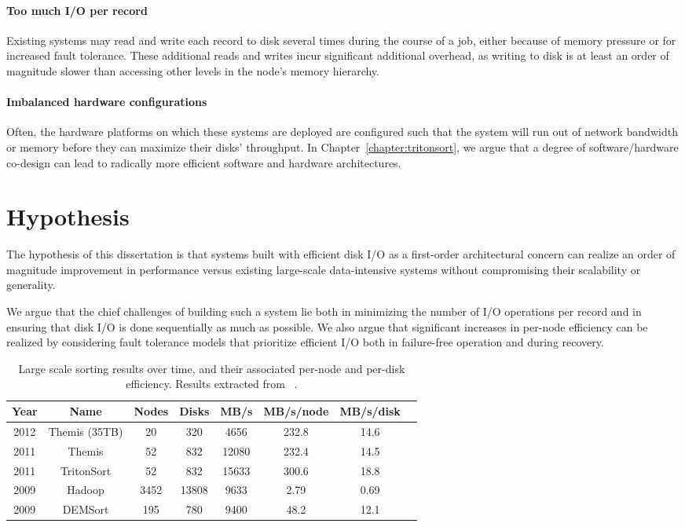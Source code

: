 \paragraph{Too much I/O per record} Existing
systems may read and write each record to disk several times during the course
of a job, either because of memory pressure or for increased fault
tolerance. These additional reads and writes incur significant additional
overhead, as writing to disk is at least an order of magnitude slower than
accessing other levels in the node's memory hierarchy.

\paragraph{Imbalanced hardware configurations} Often, the hardware platforms on
which these systems are deployed are configured such that the system will run
out of network bandwidth or memory before they can maximize their disks'
throughput. In Chapter~\ref{chapter:tritonsort}, we argue that a degree of
software/hardware co-design can lead to radically more efficient software and
hardware architectures.

\section{Hypothesis}

The hypothesis of this dissertation is that systems built with efficient disk
I/O as a first-order architectural concern can realize an order of magnitude
improvement in performance versus existing large-scale data-intensive systems
without compromising their scalability or generality.

We argue that the chief challenges of building such a system lie both in
minimizing the number of I/O operations per record and in ensuring that disk
I/O is done sequentially as much as possible. We also argue that significant
increases in per-node efficiency can be realized by considering fault tolerance
models that prioritize efficient I/O both in failure-free operation and during
recovery.

\begin{table}[ht]
\caption{\label{table:system-efficiency} Large scale sorting results over time,
  and their associated per-node and per-disk efficiency. Results extracted from
  ~\cite{efficiency-matters, hadoop-sort-2009, themis, tritonsort}.}
\centering
\begin{tabular}{|c|c|c|c|c|c|c|c|}
\hline
\textbf{Year} & \textbf{Name} & \textbf{Nodes} & \textbf{Disks} & \textbf{MB/s} & \textbf{MB/s/node} & \textbf{MB/s/disk}\\
\hline
2012 & Themis (35TB) & 20 & 320 & 4656 & 232.8 & 14.6 \\
2011 & Themis & 52 & 832 & 12080 & 232.4 & 14.5 \\
2011 & TritonSort & 52 & 832  & 15633 & 300.6 & 18.8 \\
2009 & Hadoop & 3452 & 13808 & 9633 & 2.79 & 0.69 \\
2009 & DEMSort & 195 & 780 & 9400 & 48.2 & 12.1\\
\hline
\end{tabular}
\end{table}

